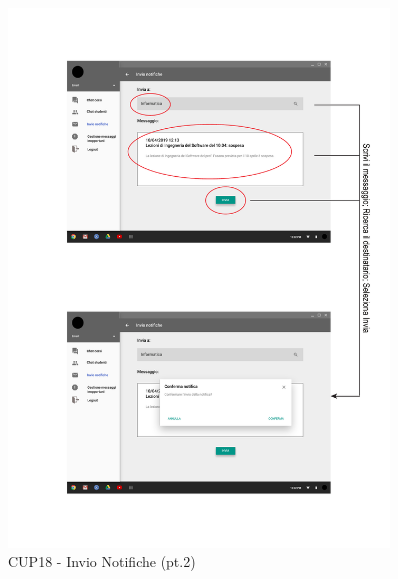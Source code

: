 \begin{figure}
	\centering
	\includegraphics[width=0.9\textwidth]{imgs/gruppo6/activities/act_cup18_invio_notifiche2.pdf}
	\caption{CUP18 - Invio Notifiche (pt.2)}
	\label{fig:act-cup18-2}
\end{figure}


